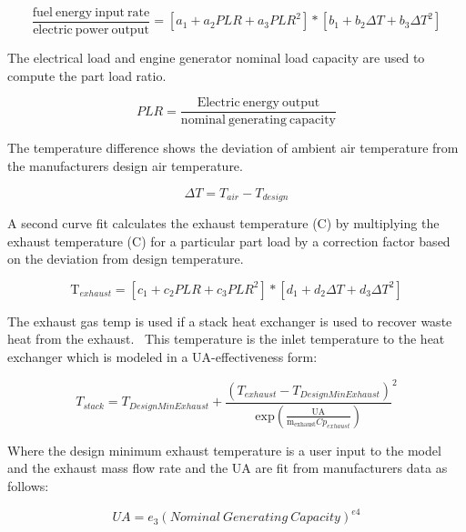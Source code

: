 \begin{equation}
\frac{{{\mathrm{fuel~energy~input~rate}}}}{{{\mathrm{electric~power~output}}}} = \left[ {{a_1} + {a_2}PLR + {a_3}PL{R^2}} \right] * \left[ {{b_1} + {b_2}\Delta T + {b_3}\Delta {T^2}} \right]
\end{equation}

The electrical load and engine generator nominal load capacity are used to compute the part load ratio.

\begin{equation}
PLR = \frac{{{\mathrm{Electric~energy~output}}}}{{{\mathrm{nominal~generating~capacity}}}}
\end{equation}

The temperature difference shows the deviation of ambient air temperature from the manufacturers design air temperature.

\begin{equation}
\Delta T = {T_{air}} - {T_{design}}
\end{equation}

A second curve fit calculates the exhaust temperature (C) by multiplying the exhaust temperature (C) for a particular part load by a correction factor based on the deviation from design temperature.

\begin{equation}
{{\mathrm{T}}_{exhaust}} = \left[ {{c_1} + {c_2}PLR + {c_3}PL{R^2}} \right] * \left[ {{d_1} + {d_2}\Delta T + {d_3}\Delta {T^2}} \right]
\end{equation}

The exhaust gas temp is used if a stack heat exchanger is used to recover waste heat from the exhaust.~ This temperature is the inlet temperature to the heat exchanger which is modeled in a UA-effectiveness form:

\begin{equation}
{T_{stack}} = {T_{DesignMinExhaust}} + {\frac{{\left( {{T_{exhaust}} - {T_{DesignMinExhaust}}} \right)}}{{{\mathrm{exp}}\left( {\frac{{{\mathrm{UA}}}}{{{{{\mathrm{\dot m}}}_{{\mathrm{exhaust}}}}C{p_{exhaust}}}}} \right)}}^2}
\end{equation}

Where the design minimum exhaust temperature is a user input to the model and the exhaust mass flow rate and the UA are fit from manufacturers data as follows:

\begin{equation}
UA = {e_3}{{(Nominal~Generating~Capacity)}^{e4}}
\end{equation}

